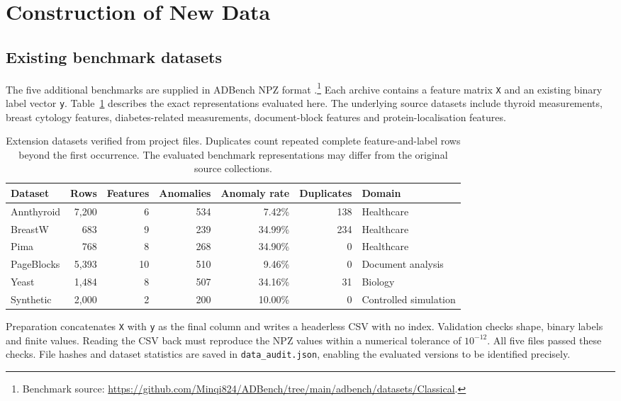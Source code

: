 \documentclass[11pt]{article}
\begin{document}
\section{Construction of New Data}
\subsection{Existing benchmark datasets}
The five additional benchmarks are supplied in ADBench NPZ format \citep{han2022adbench}.\footnote{Benchmark source: \url{https://github.com/Minqi824/ADBench/tree/main/adbench/datasets/Classical}.} Each archive contains a feature matrix \texttt{X} and an existing binary label vector \texttt{y}. Table~\ref{tab:data} describes the exact representations evaluated here. The underlying source datasets include thyroid measurements, breast cytology features, diabetes-related measurements, document-block features and protein-localisation features.

\begin{table}[t]\centering\small
\begin{tabular}{lrrrrrl}\toprule
Dataset & Rows & Features & Anomalies & Anomaly rate & Duplicates & Domain \\ \midrule
Annthyroid & 7,200 & 6 & 534 & 7.42\% & 138 & Healthcare \\
BreastW & 683 & 9 & 239 & 34.99\% & 234 & Healthcare \\
Pima & 768 & 8 & 268 & 34.90\% & 0 & Healthcare \\
PageBlocks & 5,393 & 10 & 510 & 9.46\% & 0 & Document analysis \\
Yeast & 1,484 & 8 & 507 & 34.16\% & 31 & Biology \\
Synthetic & 2,000 & 2 & 200 & 10.00\% & 0 & Controlled simulation \\
\bottomrule\end{tabular}
\caption{Extension datasets verified from project files. Duplicates count repeated complete feature-and-label rows beyond the first occurrence. The evaluated benchmark representations may differ from the original source collections.}\label{tab:data}
\end{table}

Preparation concatenates \texttt{X} with \texttt{y} as the final column and writes a headerless CSV with no index. Validation checks shape, binary labels and finite values. Reading the CSV back must reproduce the NPZ values within a numerical tolerance of $10^{-12}$. All five files passed these checks. File hashes and dataset statistics are saved in \texttt{data\_audit.json}, enabling the evaluated versions to be identified precisely.
\end{document}
